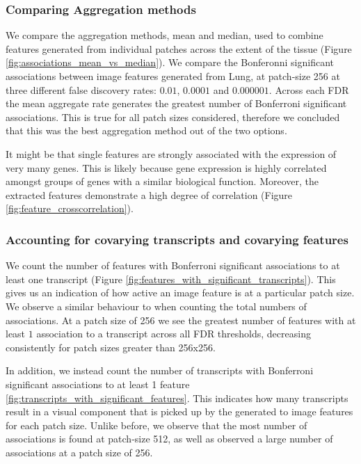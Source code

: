 \documentclass[graybox]{svmult}
\begin{document}
\subsubsection{Comparing Aggregation methods}
We compare the aggregation methods, mean and median, used to combine features generated from individual patches across the extent of the tissue (Figure \ref{fig:associations_mean_vs_median}). We compare the Bonferonni significant associations between image features generated from Lung, at patch-size 256 at three different false discovery rates: $0.01$, $0.0001$ and $0.000001$. Across each FDR the mean aggregate rate generates the greatest number of Bonferroni significant associations. This is true for all patch sizes considered, therefore we concluded that this was the best aggregation method out of the two options.

It might be that single features are strongly associated with the expression of very many genes. This is likely because gene expression is highly correlated amongst groups of genes with a similar biological function. Moreover, the extracted features demonstrate a high degree of correlation (Figure \ref{fig:feature_crosscorrelation}).



\subsubsection{Accounting for covarying transcripts and covarying features}

We count the number of features with Bonferroni significant associations to at least one transcript (Figure \ref{fig:features_with_significant_transcripts}). This gives us an indication of how active an image feature is at a particular patch size. We observe  a similar behaviour to when counting the total numbers of associations. At a patch size of 256 we see the greatest number of features with at least $1$ association to a transcript across all FDR thresholds, decreasing consistently for patch sizes greater than 256x256.


In addition, we instead count the number of transcripts with Bonferroni significant associations to at least 1 feature \ref{fig:transcripts_with_significant_features}. This indicates how many transcripts result in a visual component that is picked up by the generated to image features for each patch size. Unlike before, we observe that the most number of associations is found at patch-size 512, as well as observed a large number of associations at a patch size of 256.
\end{document}

